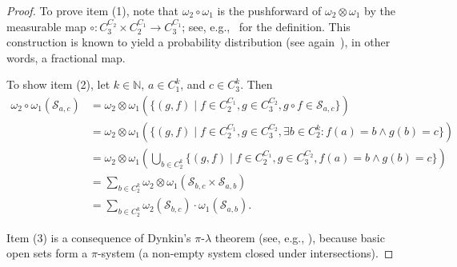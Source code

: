 \documentclass[nonacm]{acmart}
\newcommand{\N}{\mathbb N}
\begin{document}
\begin{proof}
To prove item (1), note that 
$\omega_2 \circ \omega_1$ is the pushforward of $\omega_2 \otimes \omega_1$ by the measurable map $\circ \colon  C_3^{C_2} \times C_2^{C_1} \to C_3^{C_1}$; see, e.g.,~\cite[Exercise 1.4.38]{Tao2011Measure} for the definition.
This construction is known to yield a probability distribution (see again~\cite[Exercise 1.4.38]{Tao2011Measure}), in other words, a fractional map.

To show item (2), let $k \in \N$, $a \in C_1^k$, and $c \in C_3^k$. Then 
\begin{align*}
    \omega_2 \circ \omega_1 (\mathscr{S}_{a,c}) &=
    \omega_2 \otimes \omega_1(\{(g, f) \mid f \in C_2^{C_1}, g \in C_3^{C_2}, g \circ f \in \mathscr{S}_{a,c}\})
    \\ &=\omega_2 \otimes \omega_1(\{(g,f) \mid f \in C_2^{C_1}, g \in C_3^{C_2}, \exists b \in C_2^k: f(a)=b \wedge g(b) = c\}) \\
    &= \omega_2 \otimes \omega_1\left( \bigcup_{b \in C_2^k} \{(g, f) \mid f \in C_2^{C_1}, g \in C_3^{C_2}, f(a)=b \wedge g(b) = c\}  \right)  \\
    &= \sum_{b \in C_2^k} \omega_2 \otimes \omega_1\left( \mathscr{S}_{b,c} \times \mathscr{S}_{a,b} \right) \\
    &=\sum_{b \in C_2^k} \omega_2(\mathscr{S}_{b,c}) \cdot \omega_1(\mathscr{S}_{a,b}).
\end{align*}

Item (3) is a consequence of Dynkin's $\pi$-$\lambda$ theorem (see, e.g., \cite[Lemma 4.11]{aliprantis06}), because basic open sets form a $\pi$-system (a non-empty system closed under intersections). 


\end{proof}
\end{document}
